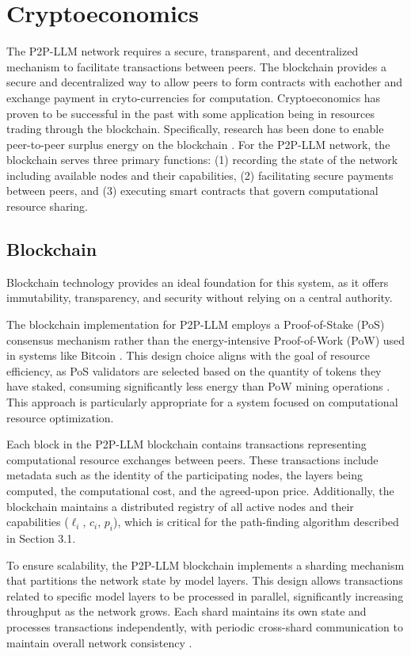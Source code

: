 \documentclass[preprint,twoside,11pt]{article}
\begin{document}
\section{Cryptoeconomics}
The P2P-LLM network requires a secure, transparent, and decentralized mechanism to facilitate transactions between peers.
The blockchain provides a secure and decentralized way to allow peers to form contracts with eachother
and exchange payment in cryto-currencies for computation.
Cryptoeconomics has proven to be successful in the past with some application being in
resources trading through the blockchain. Specifically, research has been done to enable peer-to-peer surplus energy on the blockchain \citep{WONGTHONGTHAM2021107299}.
For the P2P-LLM network, the blockchain serves three primary functions: (1) recording the state of the network including available nodes and their capabilities, (2) facilitating secure payments between peers, and (3) executing smart contracts that govern computational resource sharing.

\subsection{Blockchain}

Blockchain technology provides an ideal foundation for this system, as it offers immutability, transparency, and security without relying on a central authority.

The blockchain implementation for P2P-LLM employs a Proof-of-Stake (PoS) consensus mechanism rather than the energy-intensive Proof-of-Work (PoW) used in systems like Bitcoin \citep{nakamoto2008bitcoin}. This design choice aligns with the goal of resource efficiency, as PoS validators are selected based on the quantity of tokens they have staked, consuming significantly less energy than PoW mining operations \citep{saleh2021blockchain}. This approach is particularly appropriate for a system focused on computational resource optimization.

Each block in the P2P-LLM blockchain contains transactions representing computational resource exchanges between peers. These transactions include metadata such as the identity of the participating nodes, the layers being computed, the computational cost, and the agreed-upon price. Additionally, the blockchain maintains a distributed registry of all active nodes and their capabilities ($\ell_i$, $c_i$, $p_i$), which is critical for the path-finding algorithm described in Section 3.1.

To ensure scalability, the P2P-LLM blockchain implements a sharding mechanism that partitions the network state by model layers. This design allows transactions related to specific model layers to be processed in parallel, significantly increasing throughput as the network grows. Each shard maintains its own state and processes transactions independently, with periodic cross-shard communication to maintain overall network consistency \citep{yu2020survey}.
\end{document}
